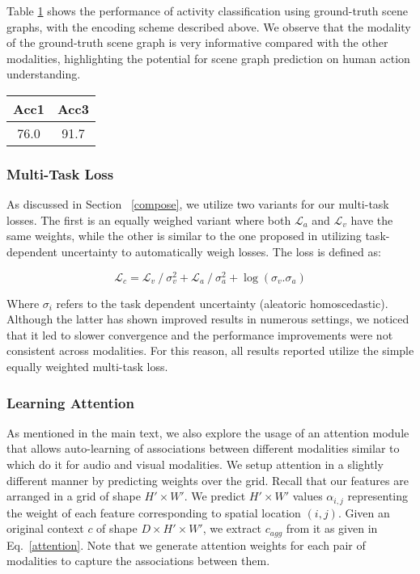 \documentclass[final]{cvpr}
\begin{document}
Table \ref{table:sg} shows the performance of activity classification using ground-truth scene graphs, with the encoding scheme described above. We observe that the modality of the ground-truth scene graph is very informative compared with the other modalities, highlighting the potential for scene graph prediction on human action understanding.

\begin{table}[hbt!]
  \centering
    \begin{tabular}{c|c} 
     \toprule
      Acc1 & Acc3\\
     \midrule
      76.0 & 91.7 \\
     \bottomrule
    \end{tabular}
    \label{table:sg}
\end{table}

\subsubsection*{Multi-Task Loss}

As discussed in Section ~\ref{compose}, we utilize two variants for our multi-task losses. The first is an equally weighed variant where both $\mathcal{L}_a$ and $\mathcal{L}_v$ have the same weights, while the other is similar to the one proposed in \cite{kendall2018multi} utilizing task-dependent uncertainty to automatically weigh losses. The loss is defined as:

\begin{equation}
    \mathcal{L}_{c} = \mathcal{L}_{v} \mathbin{/} \sigma_{v}^2 + \mathcal{L}_{a} \mathbin{/} \sigma_{a}^2 + \log ( \sigma_{v} . \sigma_{a} )
\end{equation}

Where $\sigma_i$ refers to the task dependent uncertainty (aleatoric homoscedastic). Although the latter has shown improved results in numerous settings, we noticed that it led to slower convergence and the performance improvements were not consistent across modalities. For this reason, all results reported utilize the simple equally weighted multi-task loss.

\subsubsection*{Learning Attention}

As mentioned in the main text, we also explore the usage of an attention module that allows auto-learning of associations between different modalities similar to \cite{multisensory2018} which do it for audio and visual modalities. We setup attention in a slightly different manner by predicting weights over the grid. Recall that our features are arranged in a grid of shape $H' \times W'$. We predict $H' \times W'$ values $\alpha_{i, j}$ representing the weight of each feature corresponding to spatial location $(i, j)$. Given an original context $c$ of shape $D \times H' \times W'$, we extract $c_{agg}$ from it as given in Eq.~\eqref{attention}. Note that we generate attention weights for each pair of modalities to capture the associations between them.
\end{document}
